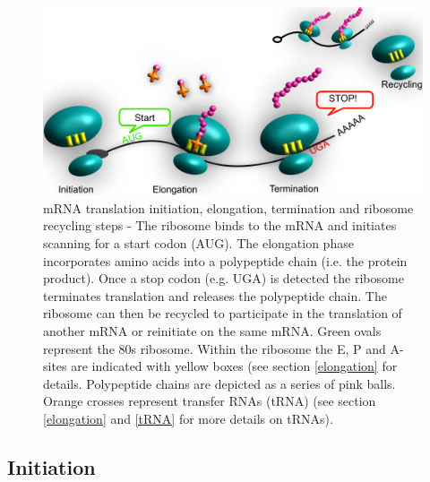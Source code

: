 \documentclass[12pt,openany]{book}
\begin{document}
\begin{figure}
  \includegraphics{./figures/doodleTranslation.pdf}
  \caption{mRNA translation initiation, elongation, termination and ribosome recycling steps - The ribosome binds to the mRNA and initiates scanning for a start codon (AUG). The elongation phase incorporates amino acids into a polypeptide chain (i.e. the protein product). Once a stop codon (e.g. UGA) is detected the ribosome terminates translation and releases the polypeptide chain. The ribosome can then be recycled to participate in the translation of another mRNA or reinitiate on the same mRNA. Green ovals represent the 80s ribosome. Within the ribosome the E, P and A-sites are indicated with yellow boxes (see section \ref{elongation} for details. Polypeptide chains are depicted as a series of pink balls. Orange crosses represent transfer RNAs (tRNA) (see section \ref{elongation} and \ref{tRNA} for more details on tRNAs).  \label{fig:doodlemRNASteps}}
\end{figure}

\clearpage

\subsection{Initiation} \label{initiation}
\end{document}
